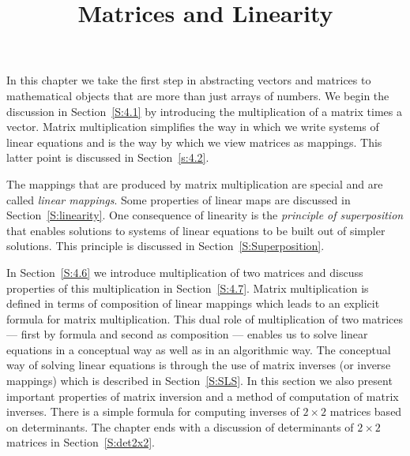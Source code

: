 \documentclass{ximera}
\title{Matrices and Linearity}
\begin{document}
\begin{abstract}
\end{abstract}
\maketitle

\normalsize

In this chapter we take the first step in abstracting vectors and matrices 
to mathematical objects that are more than just arrays of numbers.  We begin 
the discussion in Section~\ref{S:4.1} by introducing the multiplication of a 
matrix times a vector.  Matrix multiplication simplifies the way in which we 
write systems of linear equations and is the way by which we view matrices as 
mappings.  This latter point is discussed in Section~\ref{s:4.2}.

The mappings that are produced by matrix multiplication are special and
are called {\em linear mappings}.  Some properties of
linear maps are discussed in Section~\ref{S:linearity}.  One consequence of
linearity is the {\em principle of superposition\/} that enables
solutions to systems of linear equations to be built out of simpler
solutions.  This principle is discussed in Section~\ref{S:Superposition}.


In Section~\ref{S:4.6} we introduce 
multiplication of two matrices and discuss properties of this multiplication
in Section~\ref{S:4.7}.  Matrix multiplication is defined in terms of
composition of linear mappings which leads to an explicit formula for matrix
multiplication.   This dual role of multiplication of two matrices ---
first by formula and second as composition --- enables us to solve
linear equations in a conceptual way as well as in an algorithmic way.
The conceptual way of solving linear equations is through the use of
matrix inverses (or inverse mappings) which is described in
Section~\ref{S:SLS}.  In this section we also present
important properties of matrix inversion and a method of computation
of matrix inverses.  There is a simple formula for computing inverses
of $2\times 2$ matrices based on determinants.  The chapter ends with a 
discussion of determinants of $2\times 2$ matrices in Section~\ref{S:det2x2}.
\end{document}
